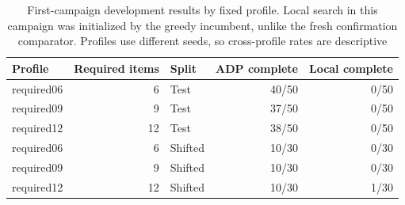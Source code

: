 \begin{table}[t]
  \centering
  \caption{First-campaign development results by fixed profile. Local search in this campaign was initialized by the greedy incumbent, unlike the fresh confirmation comparator. Profiles use different seeds, so cross-profile rates are descriptive}
  \label{tab:required-profile-results}
  \renewcommand{\arraystretch}{1.08}
  \setlength{\tabcolsep}{5pt}
  \footnotesize
  \begin{tabular}{@{}lrlrr@{}}
    \toprule
    Profile & Required items & Split & ADP complete & Local complete \\
    \midrule
    required06 & 6 & Test & 40/50 & 0/50 \\
    required09 & 9 & Test & 37/50 & 0/50 \\
    required12 & 12 & Test & 38/50 & 0/50 \\
    required06 & 6 & Shifted & 10/30 & 0/30 \\
    required09 & 9 & Shifted & 10/30 & 0/30 \\
    required12 & 12 & Shifted & 10/30 & 1/30 \\
    \bottomrule
  \end{tabular}
\end{table}
